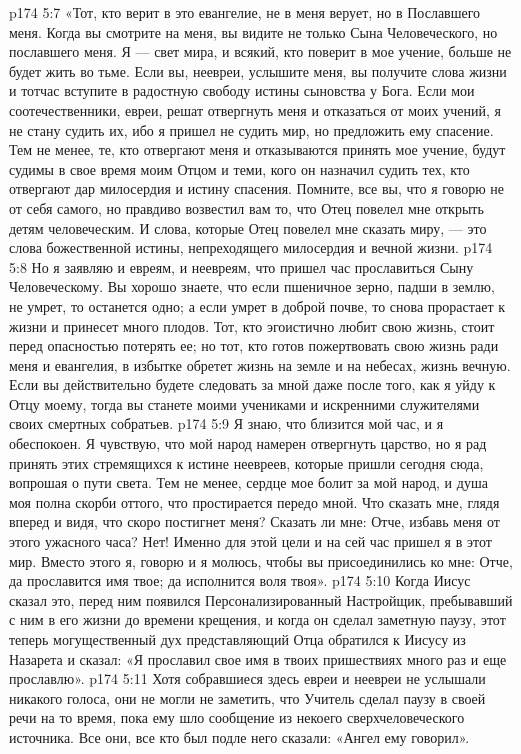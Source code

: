 \vs p174 5:7 \pc «Тот, кто верит в это евангелие, не в меня верует, но в Пославшего меня. Когда вы смотрите на меня, вы видите не только Сына Человеческого, но пославшего меня. Я --- свет мира, и всякий, кто поверит в мое учение, больше не будет жить во тьме. Если вы, неевреи, услышите меня, вы получите слова жизни и тотчас вступите в радостную свободу истины сыновства у Бога. Если мои соотечественники, евреи, решат отвергнуть меня и отказаться от моих учений, я не стану судить их, ибо я пришел не судить мир, но предложить ему спасение. Тем не менее, те, кто отвергают меня и отказываются принять мое учение, будут судимы в свое время моим Отцом и теми, кого он назначил судить тех, кто отвергают дар милосердия и истину спасения. Помните, все вы, что я говорю не от себя самого, но правдиво возвестил вам то, что Отец повелел мне открыть детям человеческим. И слова, которые Отец повелел мне сказать миру, --- это слова божественной истины, непреходящего милосердия и вечной жизни.
\vs p174 5:8 Но я заявляю и евреям, и неевреям, что пришел час прославиться Сыну Человеческому. Вы хорошо знаете, что если пшеничное зерно, падши в землю, не умрет, то останется одно; а если умрет в доброй почве, то снова прорастает к жизни и принесет много плодов. Тот, кто эгоистично любит свою жизнь, стоит перед опасностью потерять ее; но тот, кто готов пожертвовать свою жизнь ради меня и евангелия, в избытке обретет жизнь на земле и на небесах, жизнь вечную. Если вы действительно будете следовать за мной даже после того, как я уйду к Отцу моему, тогда вы станете моими учениками и искренними служителями своих смертных собратьев.
\vs p174 5:9 Я знаю, что близится мой час, и я обеспокоен. Я чувствую, что мой народ намерен отвергнуть царство, но я рад принять этих стремящихся к истине неевреев, которые пришли сегодня сюда, вопрошая о пути света. Тем не менее, сердце мое болит за мой народ, и душа моя полна скорби оттого, что простирается передо мной. Что сказать мне, глядя вперед и видя, что скоро постигнет меня? Сказать ли мне: Отче, избавь меня от этого ужасного часа? Нет! Именно для этой цели и на сей час пришел я в этот мир. Вместо этого я, говорю и я молюсь, чтобы вы присоединились ко мне: Отче, да прославится имя твое; да исполнится воля твоя».
\vs p174 5:10 Когда Иисус сказал это, перед ним появился Персонализированный Настройщик, пребывавший с ним в его жизни до времени крещения, и когда он сделал заметную паузу, этот теперь могущественный дух представляющий Отца обратился к Иисусу из Назарета и сказал: «Я прославил свое имя в твоих пришествиях много раз и еще прославлю».
\vs p174 5:11 Хотя собравшиеся здесь евреи и неевреи не услышали никакого голоса, они не могли не заметить, что Учитель сделал паузу в своей речи на то время, пока ему шло сообщение из некоего сверхчеловеческого источника. Все они, все кто был подле него сказали: «Ангел ему говорил».
